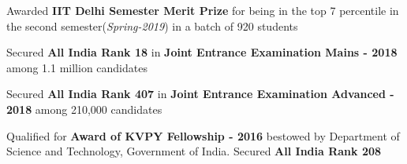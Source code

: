 
\begin{cventries}
    \cventry{}{}{}{}
    {
        \vspace{-5.0mm}
        \begin{cvitems}
            \item{Awarded \textbf{IIT Delhi Semester Merit Prize} for being in the top 7 percentile in the second semester(\textit{Spring-2019}) in a batch of 920 students}
            \vspace{5pt}
            \item{Secured \textbf{All India Rank 18} in \textbf{Joint Entrance Examination Mains - 2018} among 1.1 million candidates}
            \vspace{5pt}
            \item{Secured \textbf{All India Rank 407} in \textbf{Joint Entrance Examination Advanced - 2018} among 210,000 candidates}
            \vspace{5pt}
            \item{Qualified for \textbf{Award of KVPY Fellowship - 2016} bestowed by Department of Science and Technology,
    Government of India. \newline Secured \textbf{All India Rank 208}}
        \end{cvitems}
    }
\end{cventries}